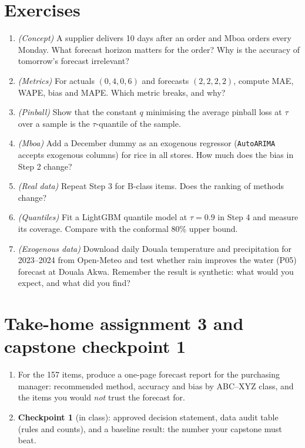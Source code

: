 \section{Exercises}
\begin{enumerate}[label=\textbf{3.\arabic*},leftmargin=2.4em]
\item \emph{(Concept)} A supplier delivers 10 days after an order and Mboa orders every Monday. What forecast horizon
matters for the order? Why is the accuracy of tomorrow's forecast irrelevant?
\item \emph{(Metrics)} For actuals $(0,4,0,6)$ and forecasts $(2,2,2,2)$, compute MAE, WAPE, bias and MAPE. Which metric
breaks, and why?
\item \emph{(Pinball)} Show that the constant $q$ minimising the average pinball loss at $\tau$ over a sample is the
$\tau$-quantile of the sample.
\item \emph{(Mboa)} Add a December dummy as an exogenous regressor (\texttt{AutoARIMA} accepts exogenous columns) for
rice in all stores. How much does the bias in Step 2 change?
\item \emph{(Real data)} Repeat Step 3 for B-class items. Does the ranking of methods change?
\item \emph{(Quantiles)} Fit a LightGBM quantile model at $\tau=0.9$ in Step 4 and measure its coverage. Compare with
the conformal 80\% upper bound.
\item \emph{(Exogenous data)} Download daily Douala temperature and precipitation for 2023--2024 from Open-Meteo and test
whether rain improves the water (P05) forecast at Douala Akwa. Remember the result is synthetic: what would you
expect, and what did you find?
\end{enumerate}

\section{Take-home assignment 3 and capstone checkpoint 1}
\begin{enumerate}[nosep]
\item For the 157 items, produce a one-page forecast report for the purchasing manager: recommended method, accuracy
and bias by ABC--XYZ class, and the items you would \emph{not} trust the forecast for.
\item \textbf{Checkpoint 1} (in class): approved decision statement, data audit table (rules and counts), and a baseline
result: the number your capstone must beat.
\end{enumerate}
